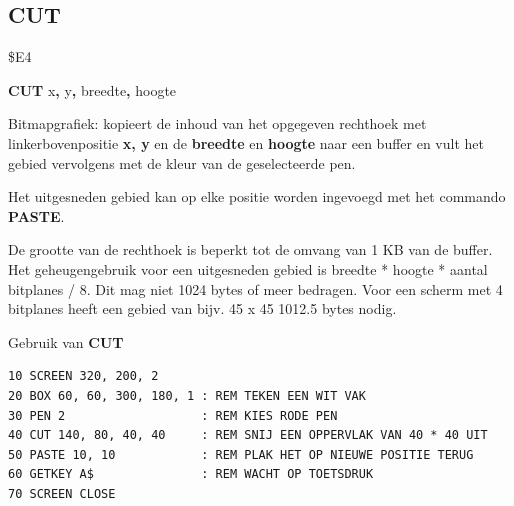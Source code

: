 
\newpage
\subsection{CUT}
\begin{description}[leftmargin=2cm,style=nextline]
\item [Token:]   \$E4

\item [Formaat:]  {\bf CUT} x{\bf,} y{\bf,} breedte{\bf,} hoogte

\item [Gebruik:]   Bitmapgrafiek: kopieert de inhoud van het opgegeven rechthoek met linkerbovenpositie {\bf x, y} en de {\bf breedte} en {\bf hoogte} naar een buffer en vult het gebied vervolgens met de kleur van de geselecteerde pen.

                 Het uitgesneden gebied kan op elke positie worden ingevoegd met het commando {\bf PASTE}.

\item [Opmerkingen:] De grootte van de rechthoek is beperkt tot de omvang van 1 KB van de buffer. Het geheugengebruik voor een uitgesneden gebied is breedte * hoogte * aantal bitplanes / 8. Dit mag niet 1024 bytes of meer bedragen. Voor een scherm met 4 bitplanes heeft een gebied van bijv. 45 x 45 1012.5 bytes nodig.

\item [Voorbeeld:] Gebruik van {\bf CUT}

\begin{tcolorbox}[colback=black,coltext=white]
\verbatimfont{\codefont}
\begin{verbatim}
10 SCREEN 320, 200, 2
20 BOX 60, 60, 300, 180, 1 : REM TEKEN EEN WIT VAK
30 PEN 2                   : REM KIES RODE PEN
40 CUT 140, 80, 40, 40     : REM SNIJ EEN OPPERVLAK VAN 40 * 40 UIT
50 PASTE 10, 10            : REM PLAK HET OP NIEUWE POSITIE TERUG
60 GETKEY A$               : REM WACHT OP TOETSDRUK
70 SCREEN CLOSE
\end{verbatim}
\end{tcolorbox}

\end{description}


\newpage

